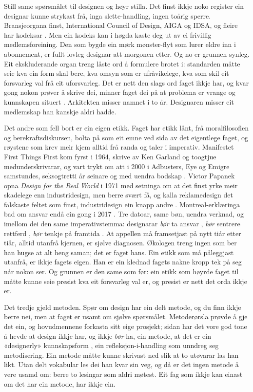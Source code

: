 Still same spørsmålet til designen og høyr stilla. Det finst ikkje noko register ein designar kunne strykast frå, inga slette-handling, ingen toårig sperre. Bransjeorgana finst, International Council of Design, AIGA og IDSA, og fleire har kodeksar \autocite{icod_code,aiga_standards,idsa_ethics}. Men ein kodeks kan i høgda kaste deg ut av ei frivillig medlemsforeining. Den som bygde ein mørk mønster-flyt som lurer eldre inn i abonnement, er fullt lovleg designar att morgonen etter. Og no er grunnen synleg. Eit ekskluderande organ treng låste ord å formulere brotet i: standarden måtte seie kva ein form skal bere, kva omsyn som er ufråvikelege, kva som skil eit forsvarleg val frå eit uforsvarleg. Det er nett den slags ord faget ikkje har, og kvar gong nokon prøver å skrive dei, minner faget dei på at problema er vrange og kunnskapen situert \autocite{buchanan1992wicked}. Arkitekten misser namnet i to år. Designaren misser eit medlemskap han kanskje aldri hadde.

Det andre som fell bort er ein eigen etikk. Faget har etikk lånt, frå moralfilosofien og berekraftsdiskursen, bolta på som eit emne ved sida av det eigentlege faget, og røystene som krev meir kjem alltid frå randa og taler i imperativ. Manifestet First Things First kom fyrst i 1964, skrive av Ken Garland og toogtjue medunderskrivarar, og vart trykt om att i 2000 i Adbusters, Eye og Emigre samstundes, seksogtretti år seinare og med uendra bodskap \autocite{firstthings2000}. Victor Papanek opna \emph{Design for the Real World} i 1971 med setninga om at det finst yrke meir skadelege enn industridesign, men berre svært få, og kalla reklamedesign det falskaste feltet som finst, industridesign ein knapp andre \autocite{papanek1971}. Montreal-erklæringa bad om ansvar endå ein gong i 2017 \autocite{montreal2017}. Tre datoar, same bøn, uendra verknad, og imellom dei den same imperativstemma: designarar \emph{bør} ta ansvar \autocite{monteiro2019}, \emph{bør} sentrere rettferd \autocite{costanzachock2020}, \emph{bør} tenkje på framtida \autocite{margolin1998sustainable}. At appellen må framsetjast på nytt tiår etter tiår, alltid utanfrå kjernen, er sjølve diagnosen. Økologen treng ingen som ber han hugse at alt heng saman; det er faget hans. Ein etikk som må påleggjast utanfrå, er ikkje fagets eigen. Han er ein klednad fagets nakne kropp tek på seg når nokon ser. Og grunnen er den same som før: ein etikk som høyrde faget til måtte kunne seie presist kva eit forsvarleg val er, og presist er nett det orda ikkje er.

Det tredje gjeld metoden. Spør om design har ein delt metode, og du finn ikkje berre nei, men at faget er usamt om sjølve spørsmålet. Metoderørsla prøvde å gje det ein, og hovudmennene forkasta sitt eige prosjekt; sidan har det vore god tone å hevde at design ikkje har, og ikkje \emph{bør} ha, ein metode, at det er ein «designerly» kunnskapsform \autocite{cross2006}, ein refleksjon-i-handling \autocite{schon1983} som unndreg seg metodisering. Ein metode måtte kunne skrivast ned slik at to utøvarar las han likt. Utan delt vokabular les dei han kvar sin veg, og då er det ingen metode å vere usamd om: berre to lesingar som aldri møtest. Eit fag som ikkje kan einast om det har ein metode, har ikkje ein.

